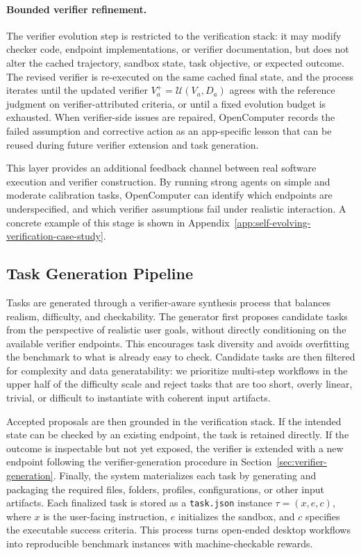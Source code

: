 \documentclass{llmxive}
\begin{document}
\paragraph{Bounded verifier refinement.} The verifier evolution step is restricted to the verification stack:
it may modify checker code, endpoint implementations, or verifier documentation,
but does not alter the cached trajectory, sandbox state, task objective, or expected outcome.
The revised verifier is re-executed on the same cached final state, and the process iterates
until the updated verifier $V_a^+ = \mathcal{U}(V_a, D_a)$ agrees with the reference judgment
on verifier-attributed criteria, or until a fixed evolution budget is exhausted.
When verifier-side issues are repaired, OpenComputer records the failed assumption and
corrective action as an app-specific lesson that can be reused during future verifier extension
and task generation.

This layer provides an additional feedback channel between real software
execution and verifier construction. By running strong agents on simple and
moderate calibration tasks, OpenComputer can identify which endpoints are underspecified, and
which verifier assumptions fail under realistic interaction. A concrete example of this stage is shown in Appendix~\ref{app:self-evolving-verification-case-study}.


\subsection{Task Generation Pipeline}

Tasks are generated through a verifier-aware synthesis process that balances realism, difficulty, and checkability. The generator first proposes candidate tasks from the perspective of realistic user goals, without directly conditioning on the available verifier endpoints. This encourages task diversity and avoids overfitting the benchmark to what is already easy to check. Candidate tasks are then filtered for complexity and data generatability: we prioritize multi-step workflows in the upper half of the difficulty scale and reject tasks that are too short, overly linear, trivial, or difficult to instantiate with coherent input artifacts.

Accepted proposals are then grounded in the verification stack. If the intended state can be checked by an existing endpoint, the task is retained directly. If the outcome is inspectable but not yet exposed, the verifier is extended with a new endpoint following the verifier-generation procedure in Section~\ref{sec:verifier-generation}. Finally, the system materializes each task by generating and packaging the required files, folders, profiles, configurations, or other input artifacts. Each finalized task is stored as a \texttt{task.json} instance $\tau=(x,e,c)$, where $x$ is the user-facing instruction, $e$ initializes the sandbox, and $c$ specifies the executable success criteria. This process turns open-ended desktop workflows into reproducible benchmark instances with machine-checkable rewards.
\end{document}
